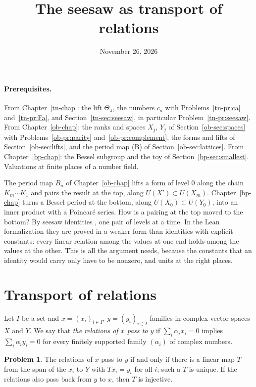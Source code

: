 \documentclass[reqno]{amsart}
\title{The seesaw as transport of relations}
\author{}
\date{November 26, 2026}
\newcounter{chap}
\theoremstyle{definition}
\newtheorem{problem}{Problem}[section]
\theoremstyle{plain}
\theoremstyle{remark}
\begin{document}
\maketitle
{}\label{chap}

\paragraph{Prerequisites.}
From Chapter~\ref{tn-chap}: the lift \(\Theta_\lambda\), the numbers \(c_a\) with Problems~\ref{tn-pr:ca} and~\ref{tn-pr:Fa}, and Section~\ref{tn-sec:seesaw}, in particular Problem~\ref{tn-pr:seesaw}.  From Chapter~\ref{ob-chap}: the ranks and spaces \(X_j\), \(Y_j\) of Section~\ref{ob-sec:spaces} with Problems~\ref{ob-pr:parity} and~\ref{ob-pr:complement}, the forms and lifts of Section~\ref{ob-sec:lifts}, and the period map (B) of Section~\ref{ob-sec:lattices}.  From Chapter~\ref{bp-chap}: the Bessel subgroup and the toy of Section~\ref{bp-sec:smallest}.  Valuations at finite places of a number field.

\medskip
The period map \(B_u\) of Chapter~\ref{ob-chap} lifts a form of level \(0\) along the chain \(K_m\cdots K_1\) and pairs the result at the top, along \(U(X')\subset U(X_m)\).  Chapter~\ref{bp-chap} turns a Bessel period at the bottom, along \(U(X_0)\subset U(Y_0)\), into an inner product with a Poincar\'e series.  How is a pairing at the top moved to the bottom?  By seesaw identities \cite{Ku}, one pair of levels at a time.  In the Lean formalization \cite{Lean} they are proved in a weaker form than identities with explicit constants: every linear relation among the values at one end holds among the values at the other.  This is all the argument needs, because the constants that an identity would carry only have to be nonzero, and units at the right places.

\section{Transport of relations}\label{sec:transport}

Let \(I\) be a set and \(x=(x_i)_{i\in I}\), \(y=(y_i)_{i\in I}\) families in complex vector spaces \(X\) and \(Y\).  We say that \emph{the relations of \(x\) pass to \(y\)} if \(\sum_i\alpha_ix_i=0\) implies \(\sum_i\alpha_iy_i=0\) for every finitely supported family \((\alpha_i)\) of complex numbers.

\begin{problem}\label{pr:linear}
The relations of \(x\) pass to \(y\) if and only if there is a linear map \(T\) from the span of the \(x_i\) to \(Y\) with \(Tx_i=y_i\) for all \(i\); such a \(T\) is unique.  If the relations also pass back from \(y\) to \(x\), then \(T\) is injective.
\end{problem}
\end{document}
